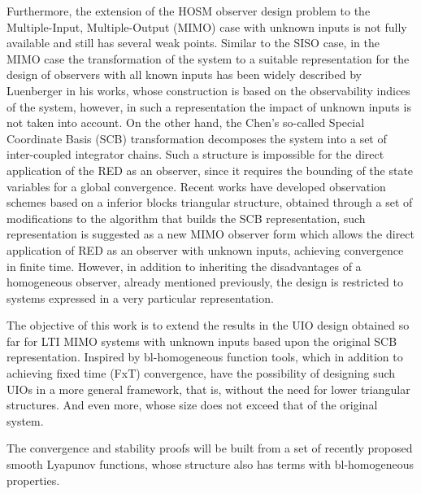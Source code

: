 \documentclass[11pt,letterpaper,twoside,openright]{report}
\begin{document}
Furthermore, the extension of the HOSM observer design problem to the Multiple-Input, Multiple-Output (MIMO) case with unknown inputs  is not fully available and still has several weak points. Similar to the SISO case, in the MIMO case the transformation of the system to a suitable representation for the design of observers with all known inputs has been widely described by Luenberger in his works, whose construction is based on the observability indices of the system, however, in such a representation the impact of unknown inputs is not taken into account\cite{Niederwieser2021}. On the other hand, the Chen's so-called Special Coordinate Basis (SCB) transformation \cite{Sannuti1986}\cite{Chen2004} decomposes the system into a set of inter-coupled integrator chains. Such a structure is impossible for the direct application of the RED as an observer, since it requires the bounding of the state variables for a global convergence. Recent works \cite{Niederwieser2021}\cite{Tranninger2021} have developed observation schemes based on a inferior blocks triangular structure, obtained through a set of modifications to the algorithm that builds the SCB representation, such representation is suggested as a new MIMO observer form which allows the direct application of RED as an observer with unknown inputs, achieving convergence in finite time. However, in addition to inheriting the disadvantages of a homogeneous observer, already mentioned previously, the design is restricted to systems expressed in a very particular representation.

The objective of this work is to extend the results in the UIO design obtained so far for LTI MIMO systems with unknown inputs based upon the original SCB representation. Inspired by bl-homogeneous function tools, which in addition to achieving fixed time (FxT) convergence, have the possibility of designing such UIOs in a more general framework, that is, without the need for lower triangular structures. And even more, whose size does not exceed that of the original system.

The convergence and stability proofs will be built from a set of recently proposed smooth Lyapunov functions, whose structure also has terms with bl-homogeneous properties.
\end{document}
